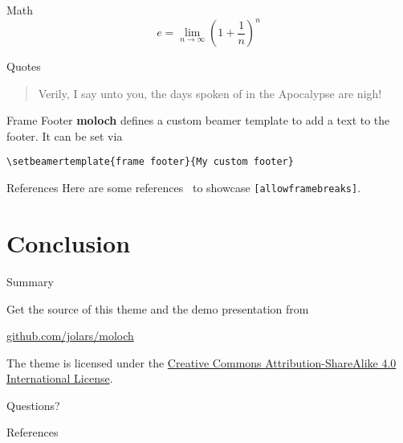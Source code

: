 \documentclass[10pt]{beamer}
\newcommand{\themename}{\textbf{moloch}\xspace}
\begin{document}
\begin{frame}{Math}
  \begin{equation*}
    e = \lim_{n\to \infty} \left(1 + \frac{1}{n}\right)^n
  \end{equation*}
\end{frame}

\begin{frame}{Quotes}
  \begin{quote}
    Verily, I say unto you, the days spoken of in the Apocalypse are nigh!
  \end{quote}
\end{frame}

{%
\begin{frame}[fragile]{Frame Footer}
  \themename defines a custom beamer template to add a text to the footer. It can be set via
  \begin{verbatim}\setbeamertemplate{frame footer}{My custom footer}\end{verbatim}
\end{frame}
}

\begin{frame}[fragile]{References}
  Here are some references~\cite{Knuth92,ConcreteMath,Simpson,Er01,greenwade93} to showcase \verb+[allowframebreaks]+.
\end{frame}

\section{Conclusion}

\begin{frame}{Summary}

  Get the source of this theme and the demo presentation from
  \begin{center}
    \url{github.com/jolars/moloch}
  \end{center}

  The theme is licensed under the
  \href{http://creativecommons.org/licenses/by-sa/4.0/}{Creative Commons
    Attribution-ShareAlike 4.0 International License}.

  \begin{center}
    \ccbysa
  \end{center}

\end{frame}

\begin{frame}[standout]
  Questions?
\end{frame}

\appendix

\begin{frame}[allowframebreaks]{References}
  
  
\end{frame}
\end{document}
